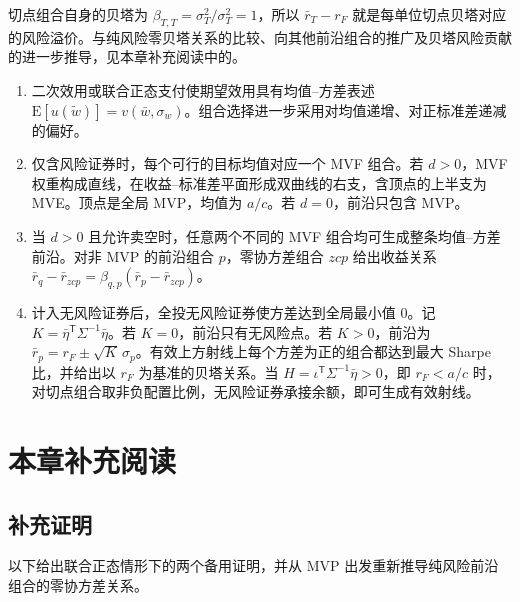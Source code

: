 切点组合自身的贝塔为 $\beta_{T,T}=\sigma_T^2/\sigma_T^2=1$，所以 $\bar r_T-r_F$ 就是每单位切点贝塔对应的风险溢价。与纯风险零贝塔关系的比较、向其他前沿组合的推广及贝塔风险贡献的进一步推导，见本章补充阅读中的。

\WJChapterSummary
\begin{tcolorbox}[summary]
\begin{enumerate}
 \item 二次效用或联合正态支付使期望效用具有均值--方差表述 $\mathrm E[u(\widetilde w)]=v(\bar w,\sigma_w)$。组合选择进一步采用对均值递增、对正标准差递减的偏好。
 \item 仅含风险证券时，每个可行的目标均值对应一个 MVF 组合。若 $d>0$，MVF 权重构成直线，在收益--标准差平面形成双曲线的右支，含顶点的上半支为 MVE。顶点是全局 MVP，均值为 $a/c$。若 $d=0$，前沿只包含 MVP。
 \item 当 $d>0$ 且允许卖空时，任意两个不同的 MVF 组合均可生成整条均值--方差前沿。对非 MVP 的前沿组合 $p$，零协方差组合 $zcp$ 给出收益关系 $\bar r_q-\bar r_{zcp}=\beta_{q,p}(\bar r_p-\bar r_{zcp})$。
 \item 计入无风险证券后，全投无风险证券使方差达到全局最小值 $0$。记 $K=\bar\eta^{\mathsf T}\Sigma^{-1}\bar\eta$。若 $K=0$，前沿只有无风险点。若 $K>0$，前沿为 $\bar r_p=r_F\pm\sqrt K\,\sigma_p$。有效上方射线上每个方差为正的组合都达到最大 Sharpe 比，并给出以 $r_F$ 为基准的贝塔关系。当 $H=\iota^{\mathsf T}\Sigma^{-1}\bar\eta>0$，即 $r_F<a/c$ 时，对切点组合取非负配置比例，无风险证券承接余额，即可生成有效射线。
\end{enumerate}
\end{tcolorbox}

\section*{本章补充阅读}

\subsection*{补充证明}
以下给出联合正态情形下的两个备用证明，并从 MVP 出发重新推导纯风险前沿组合的零协方差关系。

